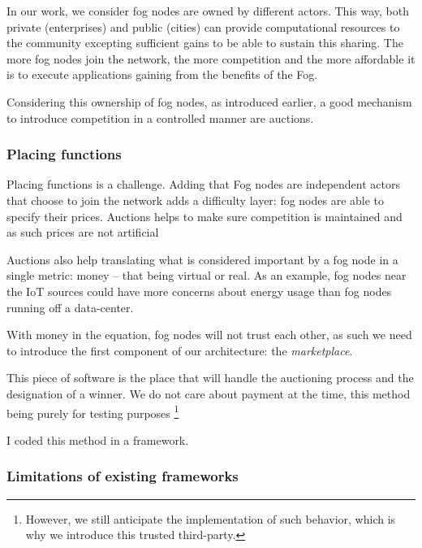 \documentclass[11pt]{sdm}
\begin{document}
In our work, we consider fog nodes are owned by different actors. This way, both private (enterprises) and public (cities) can provide computational resources to the community excepting sufficient gains to be able to sustain this sharing. The more fog nodes join the network, the more competition and the more affordable it is to execute applications gaining from the benefits of the Fog.

Considering this ownership of fog nodes, as introduced earlier, a good mechanism to introduce competition in a controlled manner are auctions. 

\subsubsection{Placing functions}

Placing functions is a challenge. Adding that Fog nodes are independent actors that choose to join the network adds a difficulty layer: fog nodes are able to specify their prices. Auctions helps to make sure competition is maintained and as such prices are not artificial 

Auctions also help translating what is considered important by a fog node in a single metric: money – that being virtual or real. As an example, fog nodes near the \gls{IoT} sources could have more concerns about energy usage than fog nodes running off a data-center.

With money in the equation, fog nodes will not trust each other, as such we need to introduce the first component of our architecture: the \emph{marketplace}.

This piece of software is the place that will handle the auctioning process and the designation of a winner. We do not care about payment at the time, this method being purely for testing purposes \footnote{However, we still anticipate the implementation of such behavior, which is why we introduce this trusted third-party.}



I coded this method in a framework.

\subsubsection{Limitations of existing frameworks}
\end{document}
